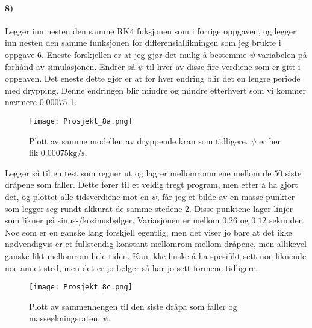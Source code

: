 \documentclass[11pt, A4paper,norsk]{article}
\begin{document}
		\paragraph{8)}
			\begin{flushleft}
Legger inn nesten den samme RK4 fuksjonen som i forrige oppgaven, og legger inn nesten den samme funksjonen for differensiallikningen som jeg brukte i oppgave $6$. Eneste forskjellen er at jeg gjør det mulig å bestemme $\psi$-variabelen på forhånd av simulasjonen. Endrer så $\psi$ til hver av disse fire verdiene som er gitt i oppgaven. Det eneste dette gjør er at for hver endring blir det en lengre periode med drypping. Denne endringen blir mindre og mindre etterhvert som vi kommer nærmere $0.00075$ \ref{8a}.
			\end{flushleft}
			\begin{figure}[H]
\texttt{[image: Prosjekt\_8a.png]}
\caption{Plott av samme modellen av dryppende kran som tidligere. $\psi$ er her lik $0.00075 \text{kg}/\text{s}$.}
\label{8a}
			\end{figure}
			\begin{flushleft}
Legger så til en test som regner ut og lagrer mellomrommene mellom de $50$ siste dråpene som faller. Dette fører til et veldig tregt program, men etter å ha gjort det, og plottet alle tidsverdiene mot en $\psi$, får jeg et bilde av en masse punkter som legger seg rundt akkurat de samme stedene  \ref{8c}. Disse punktene lager linjer som likner på sinus-/kosinusbølger. Variasjonen er mellom $0.26$ og $0.12$ sekunder. Noe som er en ganske lang forskjell egentlig, men det viser jo bare at det ikke nødvendigvis er et fullstendig konstant mellomrom mellom dråpene, men allikevel ganske likt mellomrom hele tiden. Kan ikke huske å ha spesifikt sett noe liknende noe annet sted, men det er jo bølger så har jo sett formene tidligere.
			\end{flushleft}
			\begin{figure}[H]
\texttt{[image: Prosjekt\_8c.png]}
\caption{Plott av sammenhengen til den siste dråpa som faller og masseøkningsraten, $\psi$.}
\label{8c}
			\end{figure}

			
\end{document}
